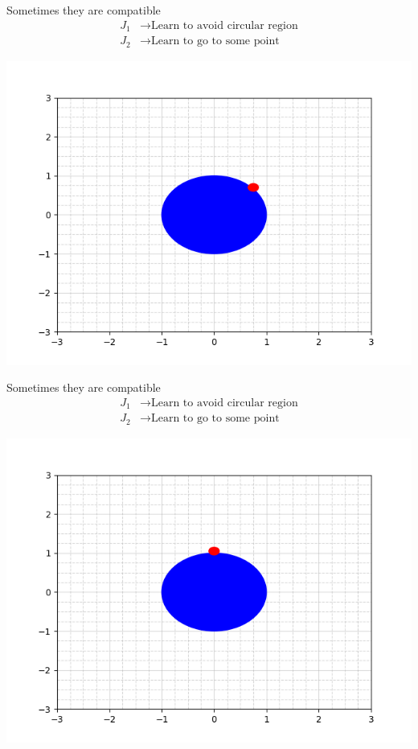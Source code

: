 \begin{frame}{Sometimes they are compatible}
	\begin{align*}
		{J}_1 &\rightarrow \textrm{Learn to avoid circular region} \\
		{J}_2 &\rightarrow \textrm{Learn to go to some point}
	\end{align*}
	\begin{minipage}{\textwidth}
		\centering		
		\includegraphics[width=0.5\linewidth]{a1g2}
	\end{minipage}%
\end{frame}


\begin{frame}{Sometimes they are compatible}
	\begin{align*}
		{J}_1 &\rightarrow \textrm{Learn to avoid circular region} \\
		{J}_2 &\rightarrow \textrm{Learn to go to some point}
	\end{align*}
	\begin{minipage}{\textwidth}
		\centering		
		\includegraphics[width=0.5\linewidth]{a1g3}
	\end{minipage}%
\end{frame}

